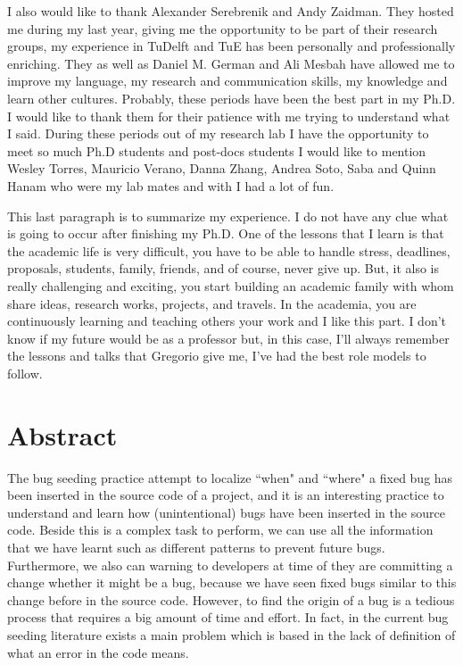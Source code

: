 \documentclass[a4paper, 12pt]{book}
\begin{document}
I also would like to thank Alexander Serebrenik and Andy Zaidman. They hosted me during my last year, giving me the opportunity to be part of their research groups, my experience in TuDelft and TuE has been personally and professionally enriching. They as well as Daniel M. German and Ali Mesbah have allowed me to improve my language, my research and communication skills, my knowledge and learn other cultures. Probably, these periods have been the best part in my Ph.D. I would like to thank them for their patience with me trying to understand what I said. During these periods out of my research lab I have the opportunity to meet so much Ph.D students and post-docs students I would like to mention Wesley Torres, Mauricio Verano, Danna Zhang, Andrea Soto, Saba and Quinn Hanam who were my lab mates and with I had a lot of fun.  

This last paragraph is to summarize my experience. I do not have any clue what is going to occur after finishing my Ph.D. One of the lessons that I learn is that the academic life is very difficult, you have to be able to handle stress, deadlines, proposals, students, family, friends, and of course, never give up. But, it also is really challenging and exciting, you start building an academic family with whom share ideas, research works, projects, and travels. In the academia, you are continuously learning and teaching others your work and I like this part. I don't know if my future would be as a professor but, in this case, I'll always remember the lessons and talks that Gregorio give me, I've had the best role models to follow.


\chapter*{Abstract}

The bug seeding practice attempt to localize ``when" and ``where" a fixed bug has been inserted in the source code of a project, and it is an interesting practice to understand and learn how (unintentional) bugs have been inserted in the source code. Beside this is a complex task to perform, we can use all the information that we have learnt such as different patterns to prevent future bugs. Furthermore, we also can warning to developers at time of they are committing a change whether it might be a bug, because we have seen fixed bugs similar to this change before in the source code. However, to find the origin of a bug is a tedious process that requires a big amount of time and effort. In fact, in the current bug seeding literature exists a main problem  which is based in the lack of definition of what an error in the code means.
\end{document}
